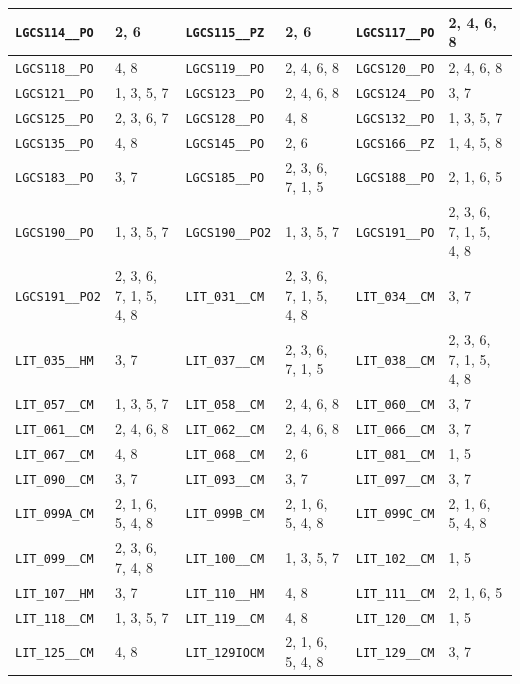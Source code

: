 \begin{longtable}{|l|l||l|l||l|l|}
    \verb|LGCS114__PO| & 2, 6 & \verb|LGCS115__PZ| & 2, 6 & \verb|LGCS117__PO| & 2, 4, 6, 8\\\hline
    \verb|LGCS118__PO| & 4, 8 & \verb|LGCS119__PO| & 2, 4, 6, 8 & \verb|LGCS120__PO| & 2, 4, 6, 8\\\hline
    \verb|LGCS121__PO| & 1, 3, 5, 7 & \verb|LGCS123__PO| & 2, 4, 6, 8 & \verb|LGCS124__PO| & 3, 7\\\hline
    \verb|LGCS125__PO| & 2, 3, 6, 7 & \verb|LGCS128__PO| & 4, 8 & \verb|LGCS132__PO| & 1, 3, 5, 7\\\hline
    \verb|LGCS135__PO| & 4, 8 & \verb|LGCS145__PO| & 2, 6 & \verb|LGCS166__PZ| & 1, 4, 5, 8\\\hline
    \verb|LGCS183__PO| & 3, 7 & \verb|LGCS185__PO| & 2, 3, 6, 7, 1, 5 & \verb|LGCS188__PO| & 2, 1, 6, 5\\\hline
    \verb|LGCS190__PO| & 1, 3, 5, 7 & \verb|LGCS190__PO2| & 1, 3, 5, 7 & \verb|LGCS191__PO| & 2, 3, 6, 7, 1, 5, 4, 8\\\hline
    \verb|LGCS191__PO2| & 2, 3, 6, 7, 1, 5, 4, 8 & \verb|LIT_031__CM| & 2, 3, 6, 7, 1, 5, 4, 8 & \verb|LIT_034__CM| & 3, 7\\\hline
    \verb|LIT_035__HM| & 3, 7 & \verb|LIT_037__CM| & 2, 3, 6, 7, 1, 5 & \verb|LIT_038__CM| & 2, 3, 6, 7, 1, 5, 4, 8\\\hline
    \verb|LIT_057__CM| & 1, 3, 5, 7 & \verb|LIT_058__CM| & 2, 4, 6, 8 & \verb|LIT_060__CM| & 3, 7\\\hline
    \verb|LIT_061__CM| & 2, 4, 6, 8 & \verb|LIT_062__CM| & 2, 4, 6, 8 & \verb|LIT_066__CM| & 3, 7\\\hline
    \verb|LIT_067__CM| & 4, 8 & \verb|LIT_068__CM| & 2, 6 & \verb|LIT_081__CM| & 1, 5\\\hline
    \verb|LIT_090__CM| & 3, 7 & \verb|LIT_093__CM| & 3, 7 & \verb|LIT_097__CM| & 3, 7\\\hline
    \verb|LIT_099A_CM| & 2, 1, 6, 5, 4, 8 & \verb|LIT_099B_CM| & 2, 1, 6, 5, 4, 8 & \verb|LIT_099C_CM| & 2, 1, 6, 5, 4, 8\\\hline
    \verb|LIT_099__CM| & 2, 3, 6, 7, 4, 8 & \verb|LIT_100__CM| & 1, 3, 5, 7 & \verb|LIT_102__CM| & 1, 5\\\hline
    \verb|LIT_107__HM| & 3, 7 & \verb|LIT_110__HM| & 4, 8 & \verb|LIT_111__CM| & 2, 1, 6, 5\\\hline
    \verb|LIT_118__CM| & 1, 3, 5, 7 & \verb|LIT_119__CM| & 4, 8 & \verb|LIT_120__CM| & 1, 5\\\hline
    \verb|LIT_125__CM| & 4, 8 & \verb|LIT_129IOCM| & 2, 1, 6, 5, 4, 8 & \verb|LIT_129__CM| & 3, 7\\\hline

\end{longtable}
